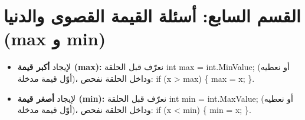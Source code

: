 \documentclass[14pt]{extarticle}
\begin{document}
\clearpage
\section*{القسم السابع: أسئلة القيمة القصوى والدنيا (\textenglish{max} و \textenglish{min})}

\begin{boxNote}
\begin{itemize}[nosep]
    \item لإيجاد \textbf{أكبر قيمة (\textenglish{max}):} نعرّف قبل الحلقة \textenglish{int max = int.MinValue;} (أو نعطيه أوّل قيمة مدخلة)، وداخل الحلقة نفحص: \textenglish{if (x > max) \{ max = x; \}}.
    \item لإيجاد \textbf{أصغر قيمة (\textenglish{min}):} نعرّف قبل الحلقة \textenglish{int min = int.MaxValue;} (أو نعطيه أوّل قيمة مدخلة)، وداخل الحلقة نفحص: \textenglish{if (x < min) \{ min = x; \}}.
\end{itemize}
\end{boxNote}
\end{document}
